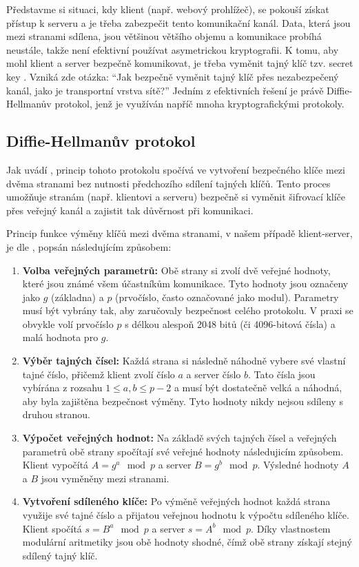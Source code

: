 Představme si situaci, kdy klient (např. webový prohlížeč), se pokouší získat přístup k serveru a je třeba zabezpečit tento komunikační kanál. Data, která jsou mezi stranami sdílena, jsou většinou většího objemu a komunikace probíhá neustále, takže není efektivní používat asymetrickou kryptografii. K tomu, aby mohl klient a server bezpečně komunikovat, je třeba vyměnit tajný klíč tzv. secret key \textcite{wikijs2024}. Vzniká zde otázka: \enquote{Jak bezpečně vyměnit tajný klíč přes nezabezpečený kanál, jako je transportní vrstva sítě?} Jedním z efektivních řešení je právě Diffie-Hellmanův protokol, jenž je využíván napříč mnoha kryptografickými protokoly.

\subsection{Diffie-Hellmanův protokol}
\label{sec:diffie-hellman}

Jak uvádí \textcite{diffie1976}, princip tohoto protokolu spočívá ve vytvoření bezpečného klíče mezi dvěma stranami bez nutnosti předchozího sdílení tajných klíčů. Tento proces umožňuje stranám (např. klientovi a serveru) bezpečně si vyměnit šifrovací klíče přes veřejný kanál a zajistit tak důvěrnost při komunikaci.

Princip funkce výměny klíčů mezi dvěma stranami, v našem případě klient-server, je dle \textcite{diffie1976}, popsán následujícím způsobem: 

\begin{enumerate}
  \item \textbf{Volba veřejných parametrů:} Obě strany si zvolí dvě veřejné hodnoty, které jsou známé všem účastníkům komunikace. Tyto hodnoty jsou označeny jako \(g\) (základna) a \(p\) (prvočíslo, často označované jako modul). Parametry musí být vybrány tak, aby zaručovaly bezpečnost celého protokolu. V praxi se obvykle volí prvočíslo \(p\) s délkou alespoň 2048 bitů (či 4096-bitová čísla) a malá hodnota pro \(g\).
  
  \item \textbf{Výběr tajných čísel:} Každá strana si následně náhodně vybere své vlastní tajné číslo, přičemž klient zvolí číslo \(a\) a server číslo \(b\). Tato čísla jsou vybírána z rozsahu \(1 \leq a, b \leq p-2\) a musí být dostatečně velká a náhodná, aby byla zajištěna bezpečnost výměny. Tyto hodnoty nikdy nejsou sdíleny s druhou stranou.
  
  \item \textbf{Výpočet veřejných hodnot:} Na základě svých tajných čísel a veřejných parametrů obě strany spočítají své veřejné hodnoty následujicím způsobem. Klient vypočítá \(A = g^a \mod p\) a server \(B = g^b \mod p\). Výsledné hodnoty \(A\) a \(B\) jsou vyměněny mezi stranami.
  
  \item \textbf{Vytvoření sdíleného klíče:} Po výměně veřejných hodnot každá strana využije své tajné číslo a přijatou veřejnou hodnotu k výpočtu sdíleného klíče. Klient spočítá \(s = B^a \mod p\) a server \(s = A^b \mod p\). Díky vlastnostem modulární aritmetiky jsou obě hodnoty shodné, čímž obě strany získají stejný sdílený tajný klíč.
\end{enumerate}

